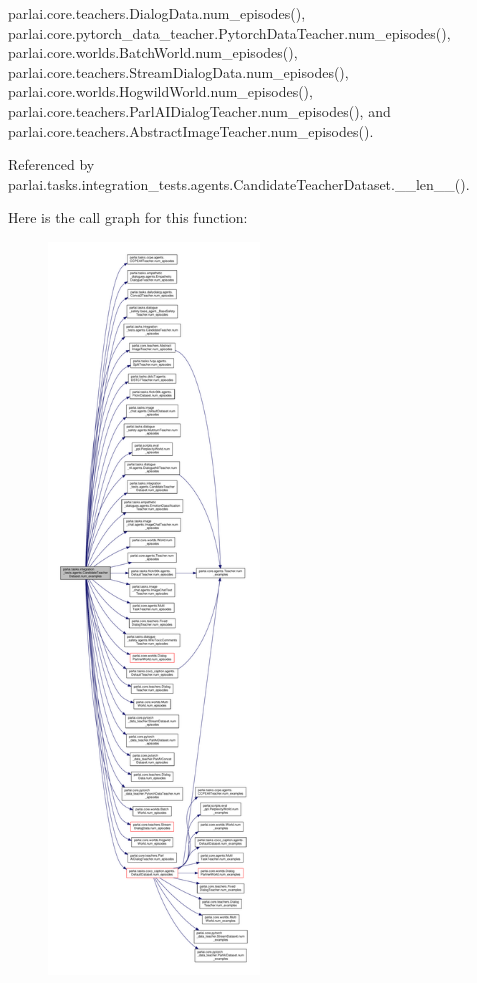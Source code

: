 parlai.\+core.\+teachers.\+Dialog\+Data.\+num\+\_\+episodes(), parlai.\+core.\+pytorch\+\_\+data\+\_\+teacher.\+Pytorch\+Data\+Teacher.\+num\+\_\+episodes(), parlai.\+core.\+worlds.\+Batch\+World.\+num\+\_\+episodes(), parlai.\+core.\+teachers.\+Stream\+Dialog\+Data.\+num\+\_\+episodes(), parlai.\+core.\+worlds.\+Hogwild\+World.\+num\+\_\+episodes(), parlai.\+core.\+teachers.\+Parl\+A\+I\+Dialog\+Teacher.\+num\+\_\+episodes(), and parlai.\+core.\+teachers.\+Abstract\+Image\+Teacher.\+num\+\_\+episodes().



Referenced by parlai.\+tasks.\+integration\+\_\+tests.\+agents.\+Candidate\+Teacher\+Dataset.\+\_\+\+\_\+len\+\_\+\+\_\+().

Here is the call graph for this function\+:
\nopagebreak
\begin{figure}[H]
\begin{center}
\leavevmode
\includegraphics[height=550pt]{classparlai_1_1tasks_1_1integration__tests_1_1agents_1_1CandidateTeacherDataset_a860cabd1611cbd98c2154d35a119895d_cgraph}
\end{center}
\end{figure}
